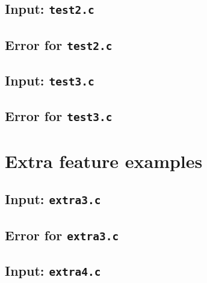 \documentclass{article}
\begin{document}


\subsection{Input: {\tt test2.c}}



\subsection{Error for {\tt test2.c}}



\subsection{Input: {\tt test3.c}}



\subsection{Error for {\tt test3.c}}




\section{Extra feature examples} \label{SEC:exmax}

\subsection{Input: {\tt extra3.c}}



\subsection{Error for {\tt extra3.c}}



\subsection{Input: {\tt extra4.c}}
\end{document}
